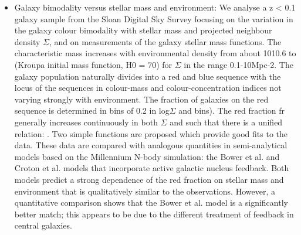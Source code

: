 \documentclass[ceqn,usenatbib,onecolumn]{mnras}
\begin{document}
\begin{itemize}
    \item \citet{2006MNRAS.373..469B} Galaxy bimodality versus stellar mass and environment: We analyse a z < 0.1 galaxy sample from the Sloan Digital Sky Survey focusing on the variation in the galaxy colour bimodality with stellar mass and projected neighbour density $\Sigma$, and on measurements of the galaxy stellar mass functions. The characteristic mass increases with environmental density from about 1010.6 to (Kroupa initial mass function, H0 = 70) for $\Sigma$ in the range 0.1-10Mpc-2. The galaxy population naturally divides into a red and blue sequence with the locus of the sequences in colour-mass and colour-concentration indices not varying strongly with environment. The fraction of galaxies on the red sequence is determined in bins of 0.2 in log$\Sigma$ and bins). The red fraction fr generally increases continuously in both $\Sigma$ and such that there is a unified relation: . Two simple functions are proposed which provide good fits to the data. These data are compared with analogous quantities in semi-analytical models based on the Millennium N-body simulation: the Bower et al. and Croton et al. models that incorporate active galactic nucleus feedback. Both models predict a strong dependence of the red fraction on stellar mass and environment that is qualitatively similar to the observations. However, a quantitative comparison shows that the Bower et al. model is a significantly better match; this appears to be due to the different treatment of feedback in central galaxies.

\end{itemize}
\end{document}
